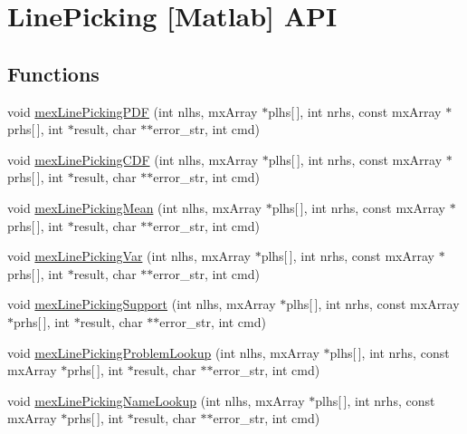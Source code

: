 \hypertarget{group__matlabapi}{\section{Line\-Picking \mbox{[}Matlab\mbox{]} A\-P\-I}
\label{group__matlabapi}
}
\subsection*{Functions}
\begin{DoxyCompactItemize}
\item 
void \hyperlink{group__matlabapi_ga415ab39c370dfeb66324d1a538a8bb7b}{mex\-Line\-Picking\-P\-D\-F} (int nlhs, mx\-Array $\ast$plhs\mbox{[}$\,$\mbox{]}, int nrhs, const mx\-Array $\ast$prhs\mbox{[}$\,$\mbox{]}, int $\ast$result, char $\ast$$\ast$error\-\_\-str, int cmd)
\item 
void \hyperlink{group__matlabapi_ga565be7534fefd6e5547869fdcb21b36f}{mex\-Line\-Picking\-C\-D\-F} (int nlhs, mx\-Array $\ast$plhs\mbox{[}$\,$\mbox{]}, int nrhs, const mx\-Array $\ast$prhs\mbox{[}$\,$\mbox{]}, int $\ast$result, char $\ast$$\ast$error\-\_\-str, int cmd)
\item 
void \hyperlink{group__matlabapi_ga6fe54a6aa7e3d2e51733dea1a443a1b2}{mex\-Line\-Picking\-Mean} (int nlhs, mx\-Array $\ast$plhs\mbox{[}$\,$\mbox{]}, int nrhs, const mx\-Array $\ast$prhs\mbox{[}$\,$\mbox{]}, int $\ast$result, char $\ast$$\ast$error\-\_\-str, int cmd)
\item 
void \hyperlink{group__matlabapi_gaceb40f4eec3174186785fca28818c09f}{mex\-Line\-Picking\-Var} (int nlhs, mx\-Array $\ast$plhs\mbox{[}$\,$\mbox{]}, int nrhs, const mx\-Array $\ast$prhs\mbox{[}$\,$\mbox{]}, int $\ast$result, char $\ast$$\ast$error\-\_\-str, int cmd)
\item 
void \hyperlink{group__matlabapi_gaa1d58f45751e79cccbc82eedccef460e}{mex\-Line\-Picking\-Support} (int nlhs, mx\-Array $\ast$plhs\mbox{[}$\,$\mbox{]}, int nrhs, const mx\-Array $\ast$prhs\mbox{[}$\,$\mbox{]}, int $\ast$result, char $\ast$$\ast$error\-\_\-str, int cmd)
\item 
void \hyperlink{group__matlabapi_ga8b9723f66253c299cb2bd065c48d1d11}{mex\-Line\-Picking\-Problem\-Lookup} (int nlhs, mx\-Array $\ast$plhs\mbox{[}$\,$\mbox{]}, int nrhs, const mx\-Array $\ast$prhs\mbox{[}$\,$\mbox{]}, int $\ast$result, char $\ast$$\ast$error\-\_\-str, int cmd)
\item 
void \hyperlink{group__matlabapi_ga16f5b629e1c765d1e1166a406d67372e}{mex\-Line\-Picking\-Name\-Lookup} (int nlhs, mx\-Array $\ast$plhs\mbox{[}$\,$\mbox{]}, int nrhs, const mx\-Array $\ast$prhs\mbox{[}$\,$\mbox{]}, int $\ast$result, char $\ast$$\ast$error\-\_\-str, int cmd)
$$
\end{DoxyCompactItemize}
